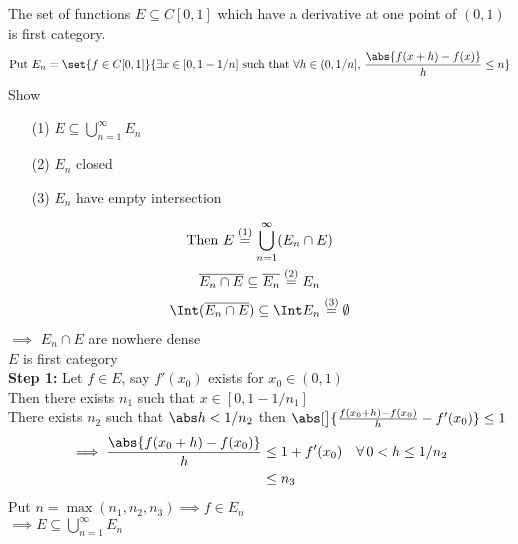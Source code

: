 \prop The set of functions $E\subseteq C[0,1]$ which have a derivative at one point of $(0,1)$ is first category. \\
\pf
\[ \text{Put } E_n = \set{f\in C[0,1]}{\exists x\in[0,1-1/n]\text{ such that }\forall h\in(0,1/n]\text{, }{\frac{\abs{f(x+h)-f(x)}}{h}}\leq n} \]
Show
\begin{enumerate}
\item[(1)] $E\subseteq\bigcup_{n=1}^\infty E_n$
\item[(2)] $E_n$ closed
\item[(3)] $E_n$ have empty intersection
\end{enumerate}
\begin{gather*}
\text{Then } E\overset{(1)}{=}\bigcup_{n=1}^\infty(E_n\cap E) \\
\overline{E_n\cap E} \subseteq \overline{E_n} \overset{(2)}{=} E_n \\
\Int(\overline{E_n\cap E}) \subseteq \Int E_n \overset{(3)}{=} \emptyset
\end{gather*}
\negthickspace$\implies$ $E_n\cap E$ are nowhere dense \\
$E$ is first category \\
\textbf{Step 1:} Let $f\in E$, say $f'(x_0)$ exists for $x_0\in(0,1)$ \\
Then there exists $n_1$ such that $x\in[0,1-1/n_1]$ \\
There exists $n_2$ such that $\abs h<1/n_2$ then $\abs[\big]{\frac{f(x_0+h)-f(x_0)}{h}-f'(x_0)}\leq1$
\begin{align*}
\implies \frac{\abs{f(x_0+h)-f(x_0)}}{h} &\leq 1 + f'(x_0) \quad \forall\,0<h\leq1/n_2 \\
&\leq n_3
\end{align*}
Put $n=\max(n_1,n_2,n_3)\implies f\in E_n$ \\
$\implies E \subseteq \bigcup_{n=1}^\infty E_n$
